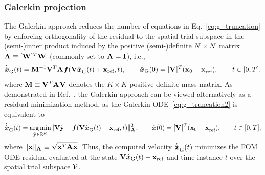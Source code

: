 \documentclass[3p,computermodern,10pt]{elsarticle}
\begin{document}
\subsubsection{Galerkin projection}
The Galerkin approach reduces the number of equations in
Eq.~\eqref{eq:g_truncation} by enforcing orthogonality of the 
residual to the spatial trial subspace in the (semi-)inner product induced by the 
positive (semi-)definite $\fomdim\times\fomdim$ matrix $\stweightingMatArg{}\equiv \stweightingMatOneTArg{ }
\stweightingMatOneArg{ }$ (commonly set to
$\stweightingMatArg{}=\mathbf{I}$), i.e.,
\begin{equation}\label{eq:g_truncation2}
\genstateGalerkinDotArg{}{t} = \massArgnt{n}^{-1} \basisspace^T \stweightingMatArg{} \velocity(\basisspace
\genstateGalerkinArg{}{t} + \stateIntercept,t), \qquad \genstateGalerkin(0) = \genstateIC, \qquad t \in [0,T],
\end{equation}
where $\massArgnt{ } \equiv \basisspace^T \stweightingMatArg{ } \basisspace$
denotes the $K\times K$ positive definite mass matrix.
As demonstrated in Ref.~\cite{carlberg_lspg_v_galerkin}, the Galerkin approach
can be viewed alternatively as a residual-minimization
method, as the Galerkin ODE~\eqref{eq:g_truncation2} is equivalent
to
\begin{equation}\label{eq:GalOptimal}
\genstateGalerkinDotArg{}{t} = \underset{ \genstateyDiscrete \in \RR{\romdim}
	}{\text{arg\,min}} \| \basisspace \hat{\stateyDiscrete} -
	\velocity(\basisspace \genstateGalerkinArg{}{t} + \stateIntercept,t)
	\|_{\stweightingMatArg{}}^2, \qquad \genstate(0) = \genstateIC,
	\qquad t \in [0,T],
\end{equation}
where $\|\mathbf{x}\|_{\stweightingMatArg{}}\equiv
\sqrt{\mathbf{x}^T\stweightingMatArg{}\mathbf{x}}$.
Thus, the computed velocity $\genstateGalerkinDotArg{}{t}$ minimizes the
FOM ODE residual evaluated at the state $\basisspace
\genstateGalerkin(t) + \stateIntercept$ and time instance $t$ over the spatial trial
subspace $\trialspace$.
\end{document}

